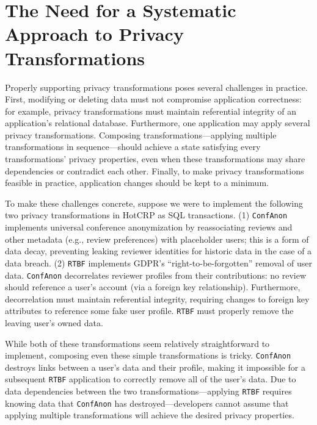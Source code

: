 \section{The Need for a Systematic Approach to Privacy Transformations}
Properly supporting privacy transformations poses several challenges in practice. First, modifying or
deleting data must not compromise application correctness: for example, privacy transformations must
maintain referential integrity of an application's relational database. 
%
Furthermore, one application may apply several privacy transformations. Composing
transformations---applying multiple transformations in sequence---should achieve a state satisfying
every transformations' privacy properties, even when these transformations may share dependencies or
contradict each other. 
%
Finally, to make privacy transformations feasible in practice, application changes should be kept to
a minimum. 
%

%
To make these challenges concrete, suppose we were to implement the following two privacy
transformations in HotCRP as SQL transactions. (1) \texttt{ConfAnon} implements universal conference
anonymization by reassociating reviews and other metadata (e.g., review preferences) with
placeholder users; this is a form of data decay, preventing leaking reviewer identities for historic data in
the case of a data breach. (2) \texttt{RTBF} implements GDPR's ``right-to-be-forgotten'' removal of user data. 
%
\texttt{ConfAnon} decorrelates reviewer profiles from their contributions: no review should reference a
user's account (via a foreign key relationship). 
Furthermore, decorrelation must maintain referential integrity, requiring changes to foreign key
attributes to reference some fake user profile.
\texttt{RTBF} must properly remove the leaving user's owned data.

While both of these transformations seem relatively straightforward to implement, composing even
these simple transformations is tricky. \texttt{ConfAnon} destroys links between a user's data and
their profile, making it impossible for a subsequent \texttt{RTBF} application to correctly remove
all of the user's data. Due to data dependencies between the two transformations---applying
\texttt{RTBF} requires knowing data that \texttt{ConfAnon} has destroyed---developers cannot assume
that applying multiple transformations will achieve the desired privacy properties.
%

